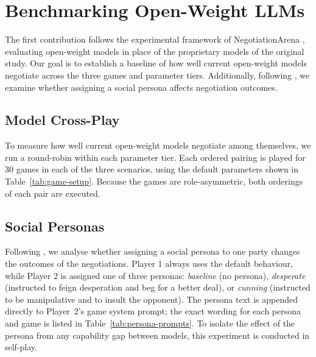 \section{Benchmarking Open-Weight LLMs} \label{sec:benchmarking}

The first contribution follows the experimental framework of NegotiationArena \cite{bianchi_how_2024}, evaluating open-weight models in place of the proprietary models of the original study. Our goal is to establish a baseline of how well current open-weight models negotiate across the three games and parameter tiers. Additionally, following \textcite{bianchi_how_2024}, we examine whether assigning a social persona affects negotiation outcomes.

\subsection{Model Cross-Play} \label{sec:cross-play}

To measure how well current open-weight models negotiate among themselves, we run a round-robin within each parameter tier. Each ordered pairing is played for 30 games in each of the three scenarios, using the default parameters shown in Table~\ref{tab:game-setup}. Because the games are role-asymmetric, both orderings of each pair are executed. 

\subsection{Social Personas} \label{sec:personas}

Following \textcite{bianchi_how_2024}, we analyse whether assigning a social persona to one party changes the outcomes of the negotiations. Player 1 always uses the default behaviour, while Player 2 is assigned one of three personas: \textit{baseline} (no persona), \textit{desperate} (instructed to feign desperation and beg for a better deal), or \textit{cunning} (instructed to be manipulative and to insult the opponent). The persona text is appended directly to Player~2's game system prompt; the exact wording for each persona and game is listed in Table~\ref{tab:persona-prompts}. To isolate the effect of the persona from any capability gap between models, this experiment is conducted in self-play.

